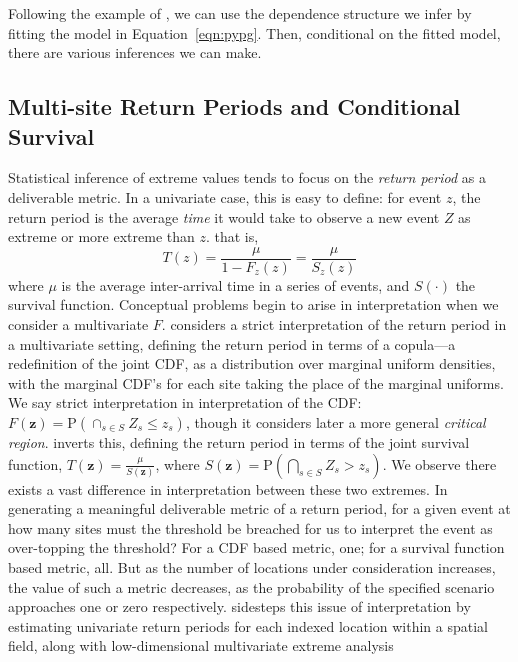 Following the example of \cite{trubey:pg}, we can use the dependence structure we infer
    by fitting the model in Equation~\eqref{eqn:pypg}.  Then, conditional on the fitted model,
    there are various inferences we can make.

\subsection{Multi-site Return Periods and Conditional Survival}
Statistical inference of extreme values tends to focus on the \emph{return period} as a deliverable
    metric.  In a univariate case, this is easy to define: for event $z$, the return period
    is the average \emph{time} it would take to observe a new event $Z$ as extreme or more extreme than $z$.
    that is,
    \[
    T(z) = \frac{\mu}{1 - F_z(z)} = \frac{\mu}{S_z(z)}
    \]
    where $\mu$ is the average inter-arrival time in a series of events, and $S(\cdot)$ the survival function. 
    Conceptual problems begin to arise in interpretation when we consider a multivariate $F$.  
    \cite{salvadori2010} considers a strict interpretation of the return period in a multivariate setting,
    defining the return period in terms of a copula---a redefinition of the joint CDF, as a distribution
    over marginal uniform densities, with the marginal CDF's for each site taking the place of the marginal 
    uniforms.  We say strict interpretation in interpretation of the CDF: 
    $F(\bm{z}) = \text{P}\left(\cap_{s \in S}Z_s\leq z_s\right)$, though it considers later a more general
    \emph{critical region}.
    \cite{Salvadori2013} inverts this, defining the return period in terms of the joint survival function, $T(\bm{z}) = \frac{\mu}{S(\bm{z})}$, where 
    $S(\bm{z}) = \text{P}\left(\bigcap_{s\in S}Z_s > z_s\right)$.
    We observe there exists a vast difference in interpretation between these two extremes.  In generating a
    meaningful deliverable metric of a return period, for a given event at how many sites
    must the threshold be breached for us to interpret the event as over-topping the threshold?  For a CDF
    based metric, one; for a survival function based metric, all.  But as the number of locations under 
    consideration increases, the value of such a metric decreases, as the probability of the specified scenario
    approaches one or zero respectively.
    \cite{cho2023} sidesteps this issue of interpretation by estimating univariate return periods for each
    indexed location within a spatial field, along with low-dimensional multivariate extreme analysis 
